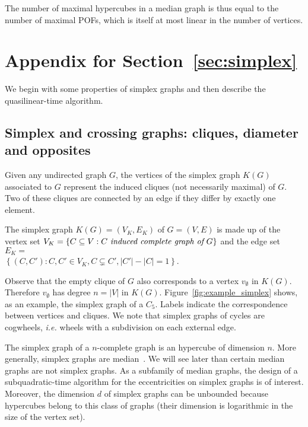 \documentclass[a4paper,UKenglish,numberwithinsect,cleveref, autoref]{lipics-v2021}
\newcommand{\set}[1]{\left\{ #1 \right\}}
\newcommand{\card}[1]{\left| #1 \right|}
\begin{document}
The number of maximal hypercubes in a median graph is thus equal to the number of maximal POFs, which is itself at most linear in the number of vertices.

\section{Appendix for Section~\ref{sec:simplex}} \label{asec:simplex}

We begin with some properties of simplex graphs and then describe the quasilinear-time algorithm.

\subsection{Simplex and crossing graphs: cliques, diameter and opposites} \label{subsec:crossing}

Given any undirected graph $G$, the vertices of the simplex graph $K(G)$ associated to $G$ represent the induced cliques (not necessarily maximal) of $G$. Two of these cliques are connected by an edge if they differ by exactly one element.

\begin{definition}
The simplex graph $K(G)=(V_K,E_K)$ of $G=(V,E)$ is made up of the vertex set $V_K = \set{C\subseteq V: C ~\emph{induced complete graph of}~ G}$ and the edge set $E_K = $\\ $\set{(C,C') : C,C' \in V_K, C \subsetneq C', \card{C'}-\card{C} = 1}$.
\label{def:simplex}
\end{definition}

Observe that the empty clique of $G$ also corresponds to a vertex $v_{\emptyset}$ in $K(G)$.  Therefore $v_{\emptyset}$ has degree $n = \card{V}$ in $K(G)$. Figure~\ref{fig:example_simplex} shows, as an example, the simplex graph of a $C_5$. Labels indicate the correspondence between vertices and cliques. We note that simplex graphs of cycles are cogwheels, {\em i.e.} wheels with a subdivision on each external edge.

The simplex graph of a $n$-complete graph is an hypercube of dimension $n$. More generally, simplex graphs are median~\cite{BaCh08,BaLeMo86}. We will see later than certain median graphs are not simplex graphs. As a subfamily of median graphs, the design of a subquadratic-time algorithm for the eccentricities on simplex graphs is of interest. Moreover, the dimension $d$ of simplex graphs can be unbounded because hypercubes belong to this class of graphs (their dimension is logarithmic in the size of the vertex set).
\end{document}
